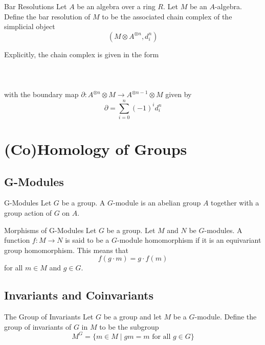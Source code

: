 \documentclass[a4paper]{article}
\begin{document}
\begin{defn}{Bar Resolutions}{} Let $A$ be an algebra over a ring $R$. Let $M$ be an $A$-algebra. Define the bar resolution of $M$ to be the associated chain complex of the simplicial object $$(M\otimes A^{\otimes n},d_i^n)$$ 
\end{defn}

Explicitly, the chain complex is given in the form \\~\\
\\~\\
with the boundary map $\partial:A^{\otimes n}\otimes M\to A^{\otimes n-1}\otimes M$ given by $$\partial=\sum_{i=0}^n(-1)^id_i^n$$


\pagebreak
\section{(Co)Homology of Groups}
\subsection{G-Modules}
\begin{defn}{G-Modules}{} Let $G$ be a group. A $G$-module is an abelian group $A$ together with a group action of $G$ on $A$. 
\end{defn}

\begin{defn}{Morphisms of G-Modules}{} Let $G$ be a group. Let $M$ and $N$ be $G$-modules. A function $f:M\to N$ is said to be a $G$-module homomorphism if it is an equivariant group homomorphism. This means that $$f(g\cdot m)=g\cdot f(m)$$ for all $m\in M$ and $g\in G$. 
\end{defn}

\subsection{Invariants and Coinvariants}
\begin{defn}{The Group of Invariants}{} Let $G$ be a group and let $M$ be a $G$-module. Define the group of invariants of $G$ in $M$ to be the subgroup $$M^G=\{m\in M\;|\;gm=m\text{ for all }g\in G\}$$
\end{defn}
\end{document}

